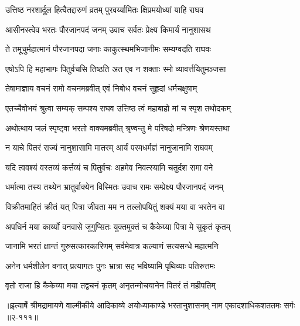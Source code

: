 \twolineshloka
{उत्तिष्ठ नरशार्दूल हित्वैतद्दारुणं व्रतम्}
{पुरवर्य्यामितः क्षिप्रमयोध्यां याहि राघव} %

\twolineshloka
{आसीनस्त्वेव भरतः पौरजानपदं जनम्}
{उवाच सर्वतः प्रेक्ष्य किमार्यं नानुशासथ} %

\twolineshloka
{ते तमूचुर्महात्मानं पौरजानपदा जनाः}
{काकुत्स्थमभिजानीमः सम्यग्वदति राघवः} %

\twolineshloka
{एषोऽपि हि महाभागः पितुर्वचसि तिष्ठति}
{अत एव न शक्ताः स्मो व्यावर्त्तयितुमञ्जसा} %

\twolineshloka
{तेषामाज्ञाय वचनं रामो वचनमब्रवीत्}
{एवं निबोध वचनं सुहृदां धर्मचक्षुषाम्} %

\twolineshloka
{एतच्चैवोभयं श्रुत्वा सम्यक् सम्पश्य राघव}
{उत्तिष्ठ त्वं महाबाहो मां च स्पृश तथोदकम्} %

\twolineshloka
{अथोत्थाय जलं स्पृष्ट्वा भरतो वाक्यमब्रवीत्}
{श्रृण्वन्तु मे परिषदो मन्त्रिणः श्रेणयस्तथा} %

\twolineshloka
{न याचे पितरं राज्यं नानुशासामि मातरम्}
{आर्यं परमधर्मज्ञं नानुजानामि राघवम्} %

\twolineshloka
{यदि त्ववश्यं वस्तव्यं कर्त्तव्यं च पितुर्वचः}
{अहमेव निवत्स्यामि चतुर्दश समा वने} %

\twolineshloka
{धर्मात्मा तस्य तथ्येन भ्रातुर्वाक्येन विस्मितः}
{उवाच रामः सम्प्रेक्ष्य पौरजानपदं जनम्} %

\twolineshloka
{विक्रीतमाहितं क्रीतं यत् पित्रा जीवता मम}
{न तल्लोपयितुं शक्यं मया वा भरतेन वा} %

\twolineshloka
{अपधिर्न मया कार्य्यो वनवासे जुगुप्सितः}
{युक्तमुक्तं च कैकेय्या पित्रा मे सुकृतं कृतम्} %

\twolineshloka
{जानामि भरतं क्षान्तं गुरुसत्कारकारिणम्}
{सर्वमेवात्र कल्याणं सत्यसन्धे महात्मनि} %

\twolineshloka
{अनेन धर्मशीलेन वनात् प्रत्यागतः पुनः}
{भ्रात्रा सह भविष्यामि पृथिव्याः पतिरुत्तमः} %

\twolineshloka
{वृतो राजा हि कैकेय्या मया तद्वचनं कृतम्}
{अनृतन्मोचयानेन पितरं तं महीपतिम्} %


॥इत्यार्षे श्रीमद्रामायणे वाल्मीकीये आदिकाव्ये अयोध्याकाण्डे भरतानुशासनम् नाम एकादशाधिकशततमः सर्गः ॥२-१११॥
